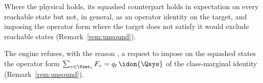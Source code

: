 
Where the physical  holds, its squashed counterpart
holds in expectation on every reachable state but not, in general, as an
operator identity on the target, and imposing the operator form where the
target does not satisfy it would exclude reachable states
(Remark~\ref{rem:unsound}).

\begin{requirement}\label{req:class-marginal-operator-form}
The engine refuses, with the reason , a
request to impose on the squashed states the operator form
$\sum_{v\in\Vset_t}F_v=q_t\,\idon{\Qsys}$ of the class-marginal identity
(Remark~\ref{rem:unsound}).
\end{requirement}
